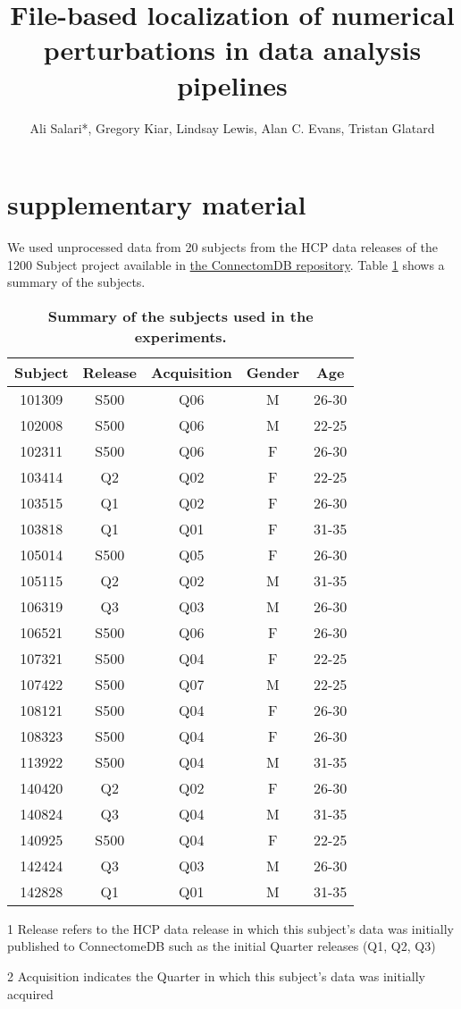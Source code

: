 \documentclass[11pt,a4paper]{osa-supplemental}
\title{File-based localization of numerical perturbations in data analysis pipelines}
\author{Ali Salari*, Gregory Kiar, Lindsay Lewis, Alan C. Evans, Tristan Glatard}
\begin{document}
\maketitle

\section{supplementary material}

We used unprocessed data from 20 subjects from the HCP data releases of the 1200 Subject project available in \href{https://db.humanconnectome.org}{the ConnectomDB repository}.
Table \ref{tab:dataset} shows a summary of the subjects. 

\begin{table}[htbp]
\centering
\begin{threeparttable}
\caption{\bf Summary of the subjects used in the experiments.}
\begin{tabular}{ccccc}
\hline
Subject & Release\tnote{1} & Acquisition\tnote{2} & Gender & Age \\
\hline
101309 & S500 & Q06 & M & 26-30 \\
102008 & S500 & Q06 & M & 22-25 \\ 
102311 & S500 & Q06 & F & 26-30 \\
103414 & Q2 & Q02 & F & 22-25 \\
103515 & Q1 & Q02 & F & 26-30 \\
103818 & Q1 & Q01 & F & 31-35 \\
105014 & S500 & Q05 & F & 26-30 \\
105115 & Q2 & Q02 & M & 31-35 \\
106319 & Q3 & Q03 & M & 26-30 \\
106521 & S500 & Q06 & F & 26-30 \\
107321 & S500 & Q04 & F & 22-25 \\
107422 & S500 & Q07 & M & 22-25 \\
108121 & S500 & Q04 & F & 26-30 \\
108323 & S500 & Q04 & F & 26-30 \\
113922 & S500 & Q04 & M & 31-35 \\
140420 & Q2 & Q02 & F & 26-30 \\
140824 & Q3 & Q04 & M & 31-35 \\
140925 & S500 & Q04 & F & 22-25 \\
142424 & Q3 & Q03 & M & 26-30 \\
142828 & Q1 & Q01 & M & 31-35 \\
\hline
\end{tabular}
  \label{tab:dataset}
  \begin{tablenotes}
  \footnotesize
    \item[1] Release refers to the HCP data release in which this subject's data was initially published to ConnectomeDB such as the initial Quarter releases (Q1, Q2, Q3)
    \item[2] Acquisition indicates the Quarter in which this subject's data was initially acquired
  \end{tablenotes}
\end{threeparttable}
\end{table}

\end{document}
